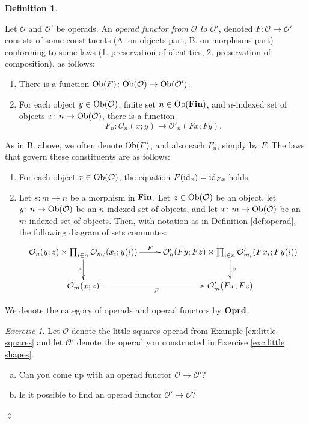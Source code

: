 \documentclass{book}
\def\tn{\textnormal}
\def\mc{\mathcal}
\def\Ob{\tn{Ob}}
\def\hsp{\hspace{.3in}}
\def\to{\rightarrow}
\def\taking{\colon}
\def\id{\tn{id}}
\def\Oprd{{\bf Oprd}}
\def\mcO{\mc{O}}
\theoremstyle{remark}
\newtheorem{exc}[subsubsection]{Exercise}
\newenvironment{exercise}{\begin{exc}}{\hspace*{\fill}$\lozenge$\end{exc}}
\theoremstyle{definition}
\newtheorem{definition}[subsubsection]{Definition}
\def\Fin{{\bf Fin}}
\def\sexc{\begin{enumerate}[a.)]\setlength{\itemsep}{.1cm}\setlength{\parskip}{.1cm}\item}
\def\next{\item}
\def\endsexc{\end{enumerate}}
\begin{document}
\begin{definition}\label{def:operad morphism}

Let $\mcO$ and $\mcO'$ be operads. An {\em operad functor from $\mcO$ to $\mcO'$}, denoted $F\taking\mcO\to\mcO'$ consists of some constituents (A. on-objects part, B. on-morphisms part) conforming to some laws (1. preservation of identities, 2. preservation of composition), as follows:
\begin{enumerate}[\hsp A.]
\item There is a function $\Ob(F)\taking\Ob(\mcO)\to\Ob(\mcO')$.
\item For each object $y\in\Ob(\mcO)$, finite set $n\in\Ob(\Fin)$, and $n$-indexed set of objects $x\taking n\to\Ob(\mcO)$, there is a function $$F_n\taking\mcO_n(x;y)\to\mcO'_n(Fx;Fy).$$
\end{enumerate}
As in B. above, we often denote $\Ob(F)$, and also each $F_n$, simply by $F$. The laws that govern these constituents are as follows:
\begin{enumerate}[\hsp 1.]
\item For each object $x\in\Ob(\mcO)$, the equation $F(\id_x)=\id_{Fx}$ holds.
\item Let $s\taking m\to n$ be a morphism in $\Fin$. Let $z\in\Ob(\mcO)$ be an object, let $y\taking n\to\Ob(\mcO)$ be an $n$-indexed set of objects, and let $x\taking m\to\Ob(\mcO)$ be an $m$-indexed set of objects. Then, with notation as in Definition \ref{def:operad}, the following diagram of sets commutes:
\begin{align}\label{dia:operad functor on composition}
\xymatrix{
\mcO_n(y;z)\times\prod_{i\in n}\mcO_{m_i}(x_i;y(i))\ar[r]^-F\ar[d]_\circ&
\mcO'_n(Fy;Fz)\times\prod_{i\in n}\mcO'_{m_i}(Fx_i;Fy(i))\ar[d]^\circ\\
\mcO_m(x;z)\ar[r]_F&\mcO'_m(Fx;Fz)
}
\end{align}
\end{enumerate}

We denote the category of operads and operad functors by $\Oprd$.

\end{definition}

\begin{exercise}
Let $\mcO$ denote the little squares operad from Example \ref{ex:little squares} and let $\mcO'$ denote the operad you constructed in Exercise \ref{exc:little shapes}.
\sexc Can you come up with an operad functor $\mcO\to\mcO'$?
\next Is it possible to find an operad functor $\mcO'\to\mcO$? 
\endsexc
\end{exercise}
\end{document}
